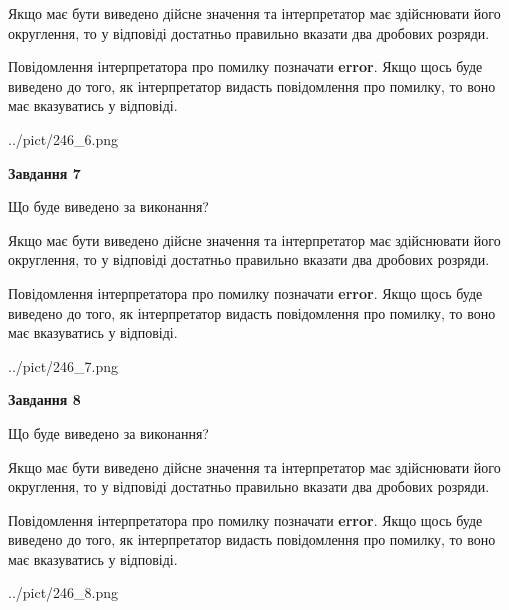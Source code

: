 \documentclass[12pt, ukrainian]{article}
\begin{document}
{\begin {Large}
Якщо має бути виведено дійсне значення та інтерпретатор має здійснювати його округлення, 
то у відповіді достатньо правильно вказати два дробових розряди.

Повідомлення інтерпретатора про помилку позначати \textbf{error}.
Якщо щось буде виведено до того, як інтерпретатор видасть повідомлення про помилку, 
то воно має вказуватись у відповіді. \par

\begin{center}
	{../pict/246_6.png}
\end{center}
\newpage

{\begin {center}\textbf{Завдання 7}\end {center}}\par
Що буде виведено за виконання? \par

Якщо має бути виведено дійсне значення та інтерпретатор має здійснювати його округлення, 
то у відповіді достатньо правильно вказати два дробових розряди.

Повідомлення інтерпретатора про помилку позначати \textbf{error}.
Якщо щось буде виведено до того, як інтерпретатор видасть повідомлення про помилку, 
то воно має вказуватись у відповіді. \par

\begin{center}
	{../pict/246_7.png}
\end{center}
\newpage

{\begin {center}\textbf{Завдання 8}\end {center}}\par
Що буде виведено за виконання? \par

Якщо має бути виведено дійсне значення та інтерпретатор має здійснювати його округлення, 
то у відповіді достатньо правильно вказати два дробових розряди.

Повідомлення інтерпретатора про помилку позначати \textbf{error}.
Якщо щось буде виведено до того, як інтерпретатор видасть повідомлення про помилку, 
то воно має вказуватись у відповіді. \par

\begin{center}
	{../pict/246_8.png}
\end{center}
\newpage


\end{Large}}
\end{document}

